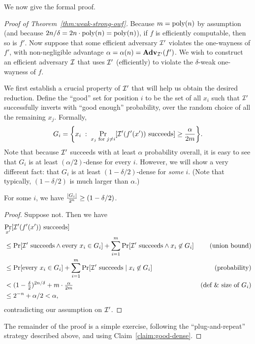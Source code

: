 \documentclass[11pt]{article}
\begin{document}
We now give the formal proof.

\begin{proof}[Proof of Theorem~\ref{thm:weak-strong-owf}]
  Because $m = \operatorname{poly}(n)$ by assumption (and because $2n/\delta = 2n
  \cdot \operatorname{poly}(n) = \operatorname{poly}(n)$), if $f$ is efficiently computable, then
  so is $f'$.  Now suppose that some efficient adversary $\mathcal{I}'$
  violates the one-wayness of $f'$, with non-negligible advantage
  $\alpha = \alpha(n) = \mathbf{Adv}_{\mathcal{I}'}(f')$.  We wish to construct an
  efficient adversary $\mathcal{I}$ that uses $\mathcal{I}'$ (efficiently) to
  violate the $\delta$-weak one-wayness of $f$.

  We first establish a crucial property of $\mathcal{I}'$ that will help us
  obtain the desired reduction.  Define the ``good'' set for position
  $i$ to be the set of all $x_{i}$ such that $\mathcal{I}'$ successfully
  inverts with ``good enough'' probability, over the random choice of
  all the remaining $x_{j}$.  Formally, \[ G_{i} = \set*{ x_{i}\;
    :\; \Pr_{x_{j} \text{ for } j \neq i} \bracks*{ \Inv'(f'(x'))
      \text{ succeeds} } \geq \frac{\alpha}{2m}}. \] Note that because
  $\mathcal{I}'$ succeeds with at least $\alpha$ probability overall, it is
  easy to see that $G_{i}$ is at least $(\alpha/2)$-dense for every
  $i$.  However, we will show a very different fact: that $G_{i}$ is
  at least $(1-\delta/2)$-dense for \emph{some} $i$.  (Note that
  typically, $(1-\delta/2)$ is much larger than $\alpha$.)

  \begin{claim}
    \label{claim:good-dense}
    For some $i$, we have $\frac{\lvert G_{i}\rvert}{2^{n}} \geq
    (1-\delta/2)$.
  \end{claim}

  \begin{proof}
    Suppose not.  Then we have
    \begin{align*}
      \lefteqn{\Pr_{x'}[\Inv'(f'(x')) \text{ succeeds]}} \\
      &\leq \Pr[\Inv' \text{ succeeds} \wedge \text{every } x_{i} \in
      G_{i}] + \sum_{i=1}^{m} \Pr[\Inv' \text{ succeeds} \wedge
      x_{i} \not\in G_{i}] & \text{(union bound)} \\
      &\leq \Pr[\text{every } x_{i} \in G_{i}] + \sum_{i=1}^{m}
      \Pr[\Inv' \text{ succeeds}\; |\; x_{i} \not\in
      G_{i}] & \text{(probability)} \\
      &< (1-\tfrac{\delta}{2})^{2n/\delta} + m \cdot \tfrac{\alpha}{2m}
      & \text{(def \& size of $G_{i}$)} \\
      &\leq 2^{-n} + \alpha/2 < \alpha,
    \end{align*}
    contradicting our assumption on $\mathcal{I}'$.
  \end{proof}

  The remainder of the proof is a simple exercise, following the
  ``plug-and-repeat'' strategy described above, and using
  Claim~\ref{claim:good-dense}.
\end{proof}
\end{document}
